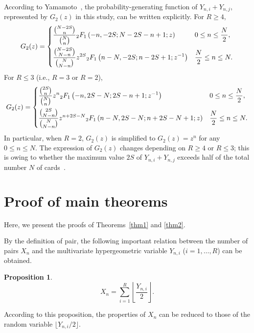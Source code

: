 \documentclass[pre, amsmath, floatfix]{revtex4-2}
\theoremstyle{plain}
\newtheorem{proposition}{Proposition}[section]
\theoremstyle{definition}
\theoremstyle{remark}
\newcommand{\GaussFsymbol}{{}_2F_1} %
\newcommand{\GaussF}[4]{\GaussFsymbol\left(#1, #2; #3; #4\right)} %
\begin{document}
According to Yamamoto~\cite{Yamamoto}, the probability-generating function of $Y_{n,i}+Y_{n,j}$, represented by $G_2(z)$ in this study, can be written explicitly.
For $R\ge 4$,
\begin{align}
G_2(z)=
\begin{dcases}
\dfrac{\binom{N-2S}{n}}{\binom{N}{n}}\GaussF{-n}{-2S}{N-2S-n+1}{z} & 0\le n\le\frac{N}{2},\\
\dfrac{\binom{N-2S}{N-n}}{\binom{N}{N-n}}z^{2S}\GaussF{n-N}{-2S}{n-2S+1}{z^{-1}} & \frac{N}{2}\le n\le N.
\end{dcases}
\label{eq:G2-1}
\end{align}
For $R\le 3$ (i.e., $R=3$ or $R=2$),
\begin{align}
G_2(z)=
\begin{dcases}
\dfrac{\binom{2S}{n}}{\binom{N}{n}}z^n\GaussF{-n}{2S-N}{2S-n+1}{z^{-1}} & 0\le n\le\frac{N}{2},\\
\dfrac{\binom{2S}{N-n}}{\binom{N}{N-n}}z^{n+2S-N}\GaussF{n-N}{2S-N}{n+2S-N+1}{z} & \frac{N}{2}\le n\le N.
\end{dcases}
\label{eq:G2-2}
\end{align}
In particular, when $R=2$, $G_2(z)$ is simplified to $G_2(z)=z^n$ for any $0\le n\le N$.
The expression of $G_2(z)$ changes depending on $R\ge4$ or $R\le3$; this is owing to whether the maximum value $2S$ of $Y_{n,i}+Y_{n,j}$ exceeds half of the total number $N$ of cards~\cite{Yamamoto}.

\section{Proof of main theorems}\label{sec4}
Here, we present the proofs of Theorems~\ref{thm1} and \ref{thm2}.

By the definition of pair, the following important relation between the number of pairs $X_n$ and the multivariate hypergeometric variable $Y_{n,i}$ ($i=1,\ldots,R$) can be obtained.

\begin{proposition}\label{prop4.1}
\[
X_n=\sum_{i=1}^R \left\lfloor\frac{Y_{n,i}}{2}\right\rfloor.
\]
\end{proposition}

According to this proposition, the properties of $X_n$ can be reduced to those of the random variable $\lfloor Y_{n,i}/2\rfloor$.
\end{document}
